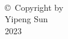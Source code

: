\thispagestyle{empty}
\hbox{\ }

\vfill
\renewcommand{\baselinestretch}{1}
\small\normalsize

\vspace{.5in}

\begin{center}
\large{
    \copyright\ Copyright by \\
    Yipeng Sun  \\
    2023
}
\end{center}

\vfill

\newpage
